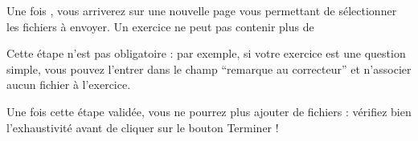 ﻿Une fois , vous arriverez sur une nouvelle page vous permettant de sélectionner les fichiers à envoyer.
Un exercice ne peut pas contenir plus de %

Cette étape n’est pas obligatoire : par exemple, si votre exercice est une question simple, vous pouvez l’entrer dans le champ “remarque au correcteur” et n’associer aucun fichier à l’exercice.

Une fois cette étape validée, vous ne pourrez plus ajouter de fichiers : vérifiez bien l’exhaustivité avant de cliquer sur le bouton Terminer !